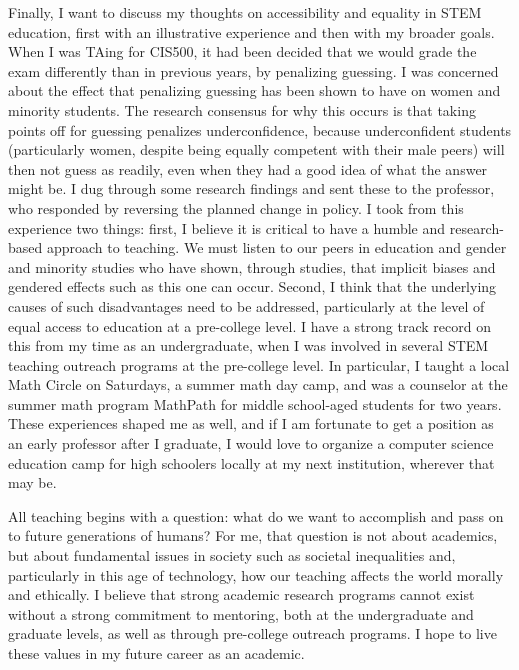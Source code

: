 \documentclass{article}
\begin{document}
Finally, I want to discuss my thoughts on accessibility and equality in STEM education, first with an illustrative experience and then with my broader goals.
When I was TAing for CIS500, it had been decided that we
would grade the exam differently than in previous years, by penalizing guessing.
I was concerned about the effect that penalizing guessing has been shown to have on women and minority students.
The research consensus for why this occurs is that taking points off for guessing penalizes underconfidence, because underconfident students (particularly women, despite being equally competent with their male peers) will then not guess as readily, even when they had a good idea of what the answer might be.
I dug through some research findings and sent these to the professor, who responded by reversing the planned change in policy.
I took from this experience two things: first,
I believe it is critical to have a humble and research-based approach to teaching. We must listen to our peers in education and gender and minority studies who have shown, through studies, that implicit biases and gendered effects such as this one can occur.
Second, I think that the underlying causes of such disadvantages need to be addressed, particularly at the level of equal access to education at a pre-college level.
I have a strong track record on this from my time as an undergraduate,
when I was involved in several STEM teaching outreach programs at the pre-college level. In particular, I taught a local Math Circle on Saturdays, a summer math day camp, and was a counselor at the summer math program MathPath for middle school-aged students for two years.
These experiences shaped me as well, and
if I am fortunate to get a position as an early professor after I graduate,
I would love to organize a computer science education
camp for high schoolers locally at my next institution, wherever that may be.

All teaching begins with a question: what do we want to accomplish and pass on to future generations of humans?
For me, that question is not about academics, but about fundamental issues in society such as societal inequalities and, particularly in this age of technology, how our teaching affects the world morally and ethically.
I believe that strong academic research programs cannot exist without a strong commitment to mentoring, both at the undergraduate and graduate levels, as well as through pre-college outreach programs.
I hope to live these values in my future career as an academic.
\end{document}
